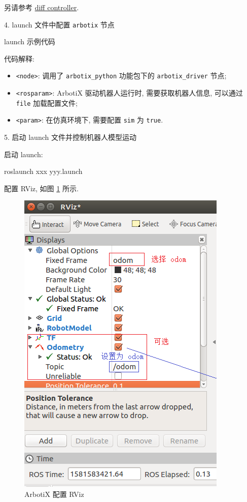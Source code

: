 \documentclass[openany, fontset=windowsold]{ctexbook}
\theoremstyle{kaiti}
\theoremstyle{normal}
\begin{document}
另请参考 \href{http://wiki.ros.org/arbotix_python/diff_controller}{diff controller}.

4. launch 文件中配置 \verb|arbotix| 节点

launch 示例代码


代码解释:

\begin{itemize}
  \item \verb|<node>|: 调用了 \verb|arbotix_python| 功能包下的 \verb|arbotix_driver| 节点;
  \item \verb|<rosparam>|: ArbotiX 驱动机器人运行时, 需要获取机器人信息, 可以通过 \verb|file| 加载配置文件;
  \item \verb|<param>|: 在仿真环境下, 需要配置 \verb|sim| 为 \verb|true|.
\end{itemize}

5. 启动 launch 文件并控制机器人模型运动

启动 launch:

\begin{bash}
  roslaunch xxx yyy.launch
\end{bash}

配置 RViz, 如图 \ref{fig:arbotix_set_rviz} 所示.

\begin{figure}[!ht]
  \centering
  \includegraphics[width=.4\textwidth]{arbotix_set_rviz.png}
  \caption{ArbotiX 配置 RViz}
  \label{fig:arbotix_set_rviz}
\end{figure}
\end{document}
